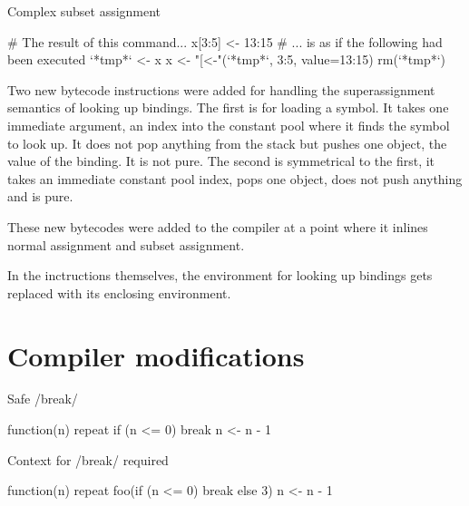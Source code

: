 \begin{listing}[htbp]
  \caption{\label{lst:subassign}Complex subset assignment}
  \begin{rcode}
# The result of this command...
x[3:5] <- 13:15
# ... is as if the following had been executed
`*tmp*` <- x
x <- "[<-"(`*tmp*`, 3:5, value=13:15)
rm(`*tmp*`)
  \end{rcode}
\end{listing}

Two new bytecode instructions were added for handling the superassignment semantics of looking up bindings. The first is for loading a symbol. It takes one immediate argument, an index into the constant pool where it finds the symbol to look up. It does not pop anything from the stack but pushes one object, the value of the binding. It is not pure. The second is symmetrical to the first, it takes an immediate constant pool index, pops one object, does not push anything and is pure.

These new bytecodes were added to the compiler at a point where it inlines normal assignment and subset assignment.

In the inctructions themselves, the environment for looking up bindings gets replaced with its enclosing environment.


\section{Compiler modifications}


\begin{listing}[htbp]
  \caption{\label{lst:local-break}Safe \rinline/break/}
  \begin{rcode}
function(n) {
    repeat {
        if (n <= 0) break
        n <- n - 1
    }
}
  \end{rcode}
\end{listing}

\begin{listing}[htbp]
  \caption{\label{lst:non-local-break}Context for \rinline/break/ required}
  \begin{rcode}
function(n) {
    repeat {
        foo(if (n <= 0) break else 3)
        n <- n - 1
    }
}
  \end{rcode}
\end{listing}


